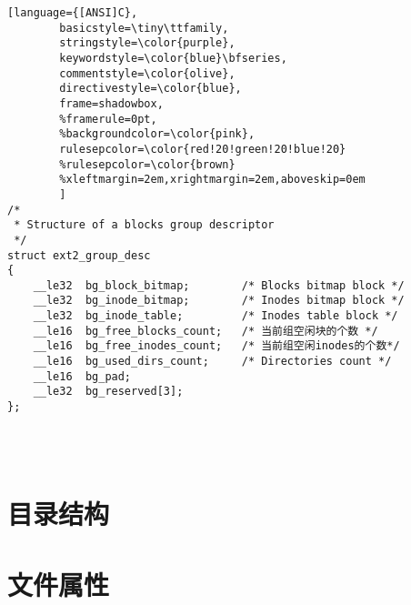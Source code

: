 \begin{lstlisting}[language={[ANSI]C},
        basicstyle=\tiny\ttfamily,
        stringstyle=\color{purple},
        keywordstyle=\color{blue}\bfseries,
        commentstyle=\color{olive},
        directivestyle=\color{blue},
        frame=shadowbox,
        %framerule=0pt,
        %backgroundcolor=\color{pink},
        rulesepcolor=\color{red!20!green!20!blue!20}
        %rulesepcolor=\color{brown}
        %xleftmargin=2em,xrightmargin=2em,aboveskip=0em
        ]
/*
 * Structure of a blocks group descriptor
 */
struct ext2_group_desc
{
	__le32	bg_block_bitmap;		/* Blocks bitmap block */
	__le32	bg_inode_bitmap;		/* Inodes bitmap block */
	__le32	bg_inode_table;			/* Inodes table block */
	__le16	bg_free_blocks_count;	/* 当前组空闲块的个数 */
	__le16	bg_free_inodes_count;	/* 当前组空闲inodes的个数*/
	__le16	bg_used_dirs_count;		/* Directories count */
	__le16	bg_pad;
	__le32	bg_reserved[3];
};




\end{lstlisting}


\section{目录结构}
\section{文件属性}
